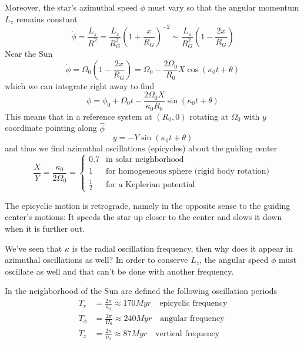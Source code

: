 Moreover, the star’s azimuthal speed $\phi$ must vary so that the angular momentum $L_{z}$ remains constant
\begin{equation*}
    \dot{\phi} = \frac{L_{z}}{R^{2}} = \frac{L_{z}}{R_{G}^{2}}\left(1+\frac{x}{R_{G}}\right)^{-2}\sim \frac{L_{z}}{R_{G}^{2}}\left(1-\frac{2x}{R_{G}}\right)
\end{equation*}
Near the Sun 
\begin{equation*}
    \dot{\phi} = \Omega_{0}\left(1-\frac{2x}{R_{G}}\right) = \Omega_{0}-\frac{2\Omega_{0}}{R_{0}}X\cos(\kappa_{0} t + \theta)
\end{equation*}
which we can integrate right away to find 
\begin{equation}
    \phi = \phi_{0}+\Omega_{0}t -\frac{2\Omega_{0}X}{\kappa_{0}R_{0}}\sin(\kappa_{0}t+\theta)
    \label{eq:azimuthal_osc}
\end{equation}
This means that in a reference system at $(R_{0},0)$ rotating at $\Omega_{0}$ with $y$ coordinate pointing along $\hat{\phi}$
\begin{equation*}
    y = -Y\sin(\kappa_{0}t+\theta)
\end{equation*}
and thus we find azimuthal oscillations (epicycles) about the guiding center
\begin{equation*}
    \frac{X}{Y} = \frac{\kappa_{0}}{2\Omega_{0}} = \left\{
        \begin{array}{ll}
            0.7 & \text{in solar neighborhood}\\
            1 & \text{for homogeneous sphere (rigid body rotation)}\\
            \frac{1}{2} & \text{for a Keplerian potential}
        \end{array}
        \right.
\end{equation*}
\par The epicyclic motion is retrograde, namely in the opposite sense to the guiding center's motions: It speeds the star up closer to the center and slows it down when it is further out.
\par We've seen that $\kappa$ is the radial oscillation frequency, then why does it appear in azimuthal oscillations as well? In order to conserve $L_{z}$, the angular speed $\phi$ must oscillate as well and that can't be done with another frequency.
\par In the neighborhood of the Sun are defined the following oscillation periods
\begin{align*}
    T_{r} &= \frac{2\pi}{\kappa_{0}} \approx 170\unit{Myr} \quad \text{epicyclic frequency}\\
    T_{\phi} &= \frac{2\pi}{\Omega_{0}} \approx 240\unit{Myr} \quad \text{angular frequency}\\
    T_{z} &= \frac{2\pi}{\nu_{0}} \approx 87\unit{Myr} \quad \text{vertical frequency}
\end{align*}

